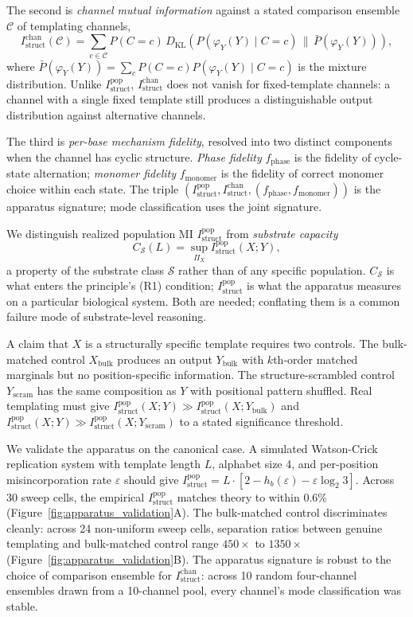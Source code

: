 \documentclass[aps,prx,reprint,amsmath,amssymb,floatfix,superscriptaddress,nofootinbib]{revtex4-2}
\theoremstyle{plain-thm}
\theoremstyle{definition-thm}
\newcommand{\Istructpop}{I_{\mathrm{struct}}^{\mathrm{pop}}}
\newcommand{\Istructchan}{I_{\mathrm{struct}}^{\mathrm{chan}}}
\newcommand{\fphase}{f_{\mathrm{phase}}}
\newcommand{\fmonomer}{f_{\mathrm{monomer}}}
\newcommand{\Csub}{C_{\mathcal{S}}}
\newcommand{\Hbin}{h_b}
\newcommand{\descY}{\varphi_Y}
\newcommand{\KL}[2]{D_{\mathrm{KL}}\!\left(#1 \,\|\, #2\right)}
\newcommand{\Sset}{\mathcal{S}}
\begin{document}
The second is \textit{channel mutual information} against a stated comparison ensemble $\mathcal{C}$ of templating channels,
\begin{equation}
\Istructchan(\mathcal{C}) = \sum_{c \in \mathcal{C}} P(C = c) \,\KL{P(\descY(Y) \mid C = c)}{\bar{P}(\descY(Y))},
\end{equation}
where $\bar{P}(\descY(Y)) = \sum_c P(C = c) P(\descY(Y) \mid C = c)$ is the mixture distribution. Unlike $\Istructpop$, $\Istructchan$ does not vanish for fixed-template channels: a channel with a single fixed template still produces a distinguishable output distribution against alternative channels.

The third is \textit{per-base mechanism fidelity}, resolved into two distinct components when the channel has cyclic structure. \textit{Phase fidelity} $\fphase$ is the fidelity of cycle-state alternation; \textit{monomer fidelity} $\fmonomer$ is the fidelity of correct monomer choice within each state. The triple $(\Istructpop, \Istructchan, (\fphase, \fmonomer))$ is the apparatus signature; mode classification uses the joint signature.

We distinguish realized population MI $\Istructpop$ from \textit{substrate capacity}
\begin{equation}
\Csub(L) = \sup_{\Pi_X} \Istructpop(X; Y),
\end{equation}
a property of the substrate class $\Sset$ rather than of any specific population. $\Csub$ is what enters the principle's (R1) condition; $\Istructpop$ is what the apparatus measures on a particular biological system. Both are needed; conflating them is a common failure mode of substrate-level reasoning.

A claim that $X$ is a structurally specific template requires two controls. The bulk-matched control $X_{\mathrm{bulk}}$ produces an output $Y_{\mathrm{bulk}}$ with $k$th-order matched marginals but no position-specific information. The structure-scrambled control $Y_{\mathrm{scram}}$ has the same composition as $Y$ with positional pattern shuffled. Real templating must give $\Istructpop(X; Y) \gg \Istructpop(X; Y_{\mathrm{bulk}})$ and $\Istructpop(X; Y) \gg \Istructpop(X; Y_{\mathrm{scram}})$ to a stated significance threshold.

We validate the apparatus on the canonical case. A simulated Watson-Crick replication system with template length $L$, alphabet size 4, and per-position misincorporation rate $\varepsilon$ should give $\Istructpop = L \cdot \left[2 - \Hbin(\varepsilon) - \varepsilon \log_2 3\right]$. Across 30 sweep cells, the empirical $\Istructpop$ matches theory to within 0.6\% (Figure~\ref{fig:apparatus_validation}A). The bulk-matched control discriminates cleanly: across 24 non-uniform sweep cells, separation ratios between genuine templating and bulk-matched control range $450 \times$ to $1350 \times$ (Figure~\ref{fig:apparatus_validation}B). The apparatus signature is robust to the choice of comparison ensemble for $\Istructchan$: across 10 random four-channel ensembles drawn from a 10-channel pool, every channel's mode classification was stable.
\end{document}
